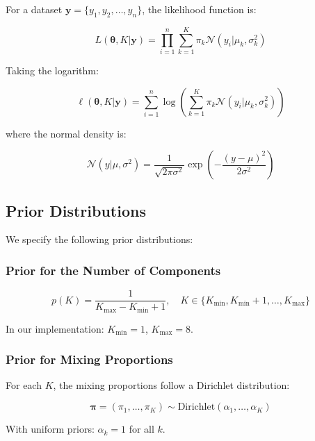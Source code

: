 \documentclass[12pt]{article}
\begin{document}
For a dataset $\mathbf{y} = \{y_1, y_2, \ldots, y_n\}$, the likelihood function is:

\begin{equation}
L(\boldsymbol{\theta}, K|\mathbf{y}) = \prod_{i=1}^n \sum_{k=1}^K \pi_k \mathcal{N}(y_i|\mu_k, \sigma_k^2)
\end{equation}

Taking the logarithm:

\begin{equation}
\ell(\boldsymbol{\theta}, K|\mathbf{y}) = \sum_{i=1}^n \log\left(\sum_{k=1}^K \pi_k \mathcal{N}(y_i|\mu_k, \sigma_k^2)\right)
\end{equation}

where the normal density is:

\begin{equation}
\mathcal{N}(y|\mu, \sigma^2) = \frac{1}{\sqrt{2\pi\sigma^2}} \exp\left(-\frac{(y-\mu)^2}{2\sigma^2}\right)
\end{equation}

\subsection{Prior Distributions}

We specify the following prior distributions:

\subsubsection{Prior for the Number of Components}

\begin{equation}
p(K) = \frac{1}{K_{\max} - K_{\min} + 1}, \quad K \in \{K_{\min}, K_{\min}+1, \ldots, K_{\max}\}
\end{equation}

In our implementation: $K_{\min} = 1$, $K_{\max} = 8$.

\subsubsection{Prior for Mixing Proportions}

For each $K$, the mixing proportions follow a Dirichlet distribution:

\begin{equation}
\boldsymbol{\pi} = (\pi_1, \ldots, \pi_K) \sim \text{Dirichlet}(\alpha_1, \ldots, \alpha_K)
\end{equation}

With uniform priors: $\alpha_k = 1$ for all $k$.
\end{document}
